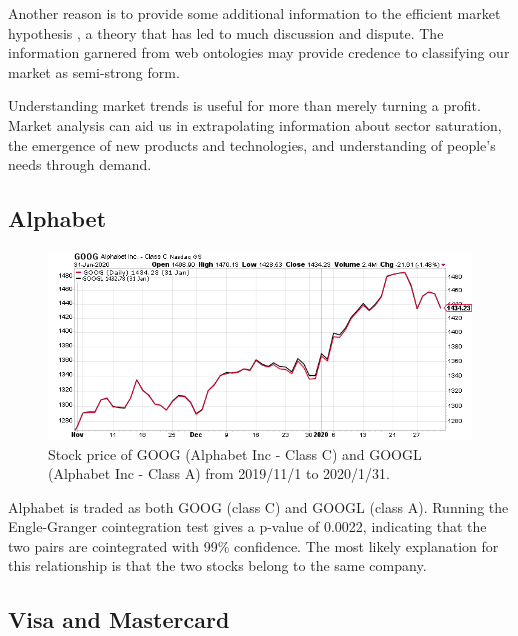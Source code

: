 \documentclass{UoYCSproject}
\begin{document}
Another reason is to provide some additional information to the efficient market hypothesis \parencite{efficientmarket}, a theory that has led to much discussion and dispute. The information garnered from web ontologies may provide credence to classifying our market as semi-strong form.

Understanding market trends is useful for more than merely turning a profit. Market analysis can aid us in extrapolating information about sector saturation, the emergence of new products and technologies, and understanding of people's needs through demand.

\subsection{Alphabet}

\begin{figure}[h]
\begin{center}
\includegraphics[trim=0 0 0 15, clip, width=\linewidth]{"./images/GOOGGOOGL"}
\end{center}
\caption{Stock price of GOOG (Alphabet Inc - Class C) and GOOGL (Alphabet Inc - Class A) from 2019/11/1 to 2020/1/31.}
\end{figure}

Alphabet is traded as both GOOG (class C) and GOOGL (class A). Running the Engle-Granger cointegration test gives a p-value of 0.0022, indicating that the two pairs are cointegrated with 99\% confidence. The most likely explanation for this relationship is that the two stocks belong to the same company. 
\newpage
\subsection{Visa and Mastercard}
\end{document}
